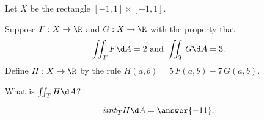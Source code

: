 \documentclass{ximera}
\author{Jim Fowler}
\begin{document}
\begin{exercise}
  Let $X$ be the rectangle $[-1,1] \times [-1,1]$.

  Suppose $F : X \to \R$ and $G : X \to \R$ with the property that
  \[
    \iint_T F \d A = 2 \mbox{ and } \iint_T G \d A = 3.
  \]
  Define $H : X \to \R$ by the rule $H(a,b) = 5 \, F(a,b) - 7 \, G(a,b)$.

  What is $\iint_T H \d A$?
  
  \begin{prompt}
    \[
      iint_T H \d A = \answer{-11}.
    \]
  \end{prompt}

\end{exercise}
\end{document}
